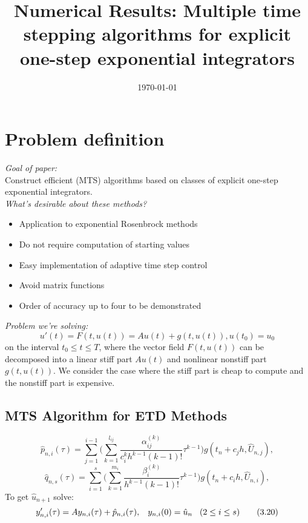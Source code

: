 \documentclass[12pt]{article}
\title{Numerical Results: Multiple time stepping algorithms for explicit one-step exponential integrators}
\author{}
\date{\today }
\begin{document}
\maketitle
\noindent
\section{Problem definition}
\emph{Goal of paper:} \\
Construct efficient (MTS) algorithms based on classes of explicit one-step exponential integrators.\\

\emph{What's desirable about these methods?}\\
\begin{itemize}
\item Application to exponential Rosenbrock methods
\item Do not require computation of starting values
\item Easy implementation of adaptive time step control
\item Avoid matrix functions
\item Order of accuracy up to four to be demonstrated
\end{itemize}

\noindent
\emph{Problem we're solving:}
\begin{equation} 
u'(t) = F(t,u(t)) = Au(t) + g(t,u(t)),  u(t_0) = u_0 \tag{1.1} \label{eq: 1.1}
\end{equation}
on the interval $t_0 \leq t \leq T$, where the vector field $F(t,u(t))$ can be decomposed into a linear stiff part $Au(t)$ and nonlinear nonstiff part $g(t,u(t))$. We consider the case where the stiff part is cheap to compute and the nonstiff part is expensive.

\subsection{MTS Algorithm for ETD Methods}
\begin{equation}
\hat{p}_{n,i}(\tau) = \sum_{j=1}^{i-1} \Bigg(\sum_{k=1}^{l_{ij}} \frac{\alpha_{ij}^{(k)}}{c_i^kh^{k-1}(k-1)!}\tau^{k-1}\Bigg)g(t_n + c_jh,\hat{U}_{n,j}),
\tag{3.19a} \label{eq: 3.19a}
\end{equation}
\begin{equation}
\hat{q}_{n,s}(\tau) = \sum_{i=1}^{s} \Bigg(\sum_{k=1}^{m_i} \frac{\beta_{i}^{(k)}}{h^{k-1}(k-1)!}\tau^{k-1}\Bigg)g(t_n + c_ih,\hat{U}_{n,i}),
\tag{3.19b} \label{eq: 3.19b}
\end{equation}
To get $\hat{u}_{n+1}$ solve: 
\begin{equation}
y'_{n,i}(\tau) = Ay_{n,i}(\tau) + \hat{p}_{n,i}(\tau), \hspace{0.3cm} y_{n,i}(0) = \hat{u}_n \hspace{0.3cm} (2\leq i \leq s)
\tag{3.20} \label{eq: 3.20}
\end{equation}
\end{document}
